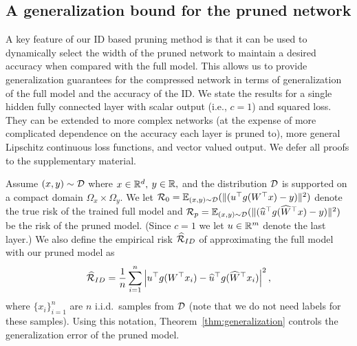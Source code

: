 %

\subsection{A generalization bound for the pruned network}
A key feature of our ID based pruning method is that it can be used to dynamically select the width of the pruned network to maintain a desired accuracy when compared with the full model. This allows us to provide generalization guarantees for the compressed network in terms of generalization of the full model and the accuracy of the ID. We state the results for a single hidden fully connected layer with scalar output (i.e., $c=1$) and squared loss. They can be extended to more complex networks (at the expense of more complicated dependence on the accuracy each layer is pruned to), more general Lipschitz continuous loss functions, and vector valued output. We defer all proofs to the supplementary material.

Assume $(x,y)\sim \mathcal{D}$ where $x\in\mathbb{R}^d,$ $y\in\mathbb{R},$ and the distribution $\mathcal{D}$ is supported on a compact domain $\Omega_x\times\Omega_y$. We let $\mathcal{R}_0 = \mathbb{E}_{(x,y) \sim \mathcal{D}}(\|({u}^\top g({W}^\top x)- y)\|^2)$ denote the true risk of the trained full model and $\mathcal{R}_p = \mathbb{E}_{(x,y) \sim \mathcal{D}}(\|({\widehat{u}}^\top g({\widehat{W}}^\top x)- y)\|^2)$ be the risk of the pruned model. (Since $c=1$ we let $u\in\mathbb{R}^m$ denote the last layer.)
We also define the empirical risk $\widehat{\mathcal{R}}_{ID}$ of approximating the full model with our pruned model as
\begin{equation*}
\label{eq:pruneRisk}
    \widehat{\mathcal{R}}_{ID}=\frac{1}{n}\sum_{i=1}^n \left\lvert{u}^\top g({W}^\top x_i) - {\widehat{u}}^\top g({\widehat{W}}^\top x_i) \right\rvert^2,
\end{equation*}
where $\{x_i\}_{i=1}^n$ are $n$ i.i.d.\ samples from $\mathcal{D}$ (note that we do not need labels for these samples). Using this notation, Theorem~\ref{thm:generalization} controls the generalization error of the pruned model.


